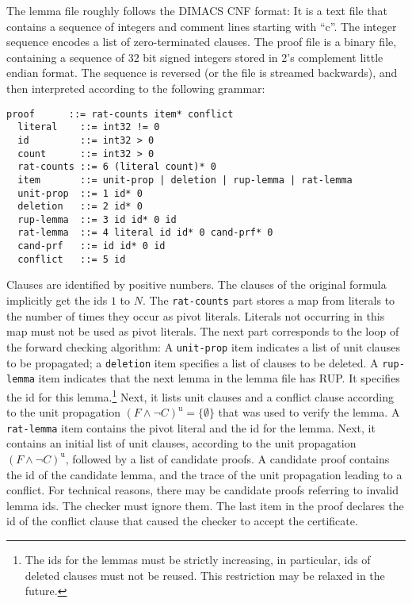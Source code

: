 \documentclass{llncs}
\newcommand{\lsti}{\lstinline[language=pseudo,basicstyle=\normalsize\ttfamily\slshape]}
\begin{document}
The lemma file roughly follows the DIMACS CNF format: It is a text file that contains a sequence of integers and comment lines starting with ``c''. 
The integer sequence encodes a list of zero-terminated clauses.
The proof file is a binary file, containing a sequence of 32 bit signed integers stored in 2's complement little endian format. 
The sequence is reversed (or the file is streamed backwards), and then interpreted according to the following grammar:
\begin{lstlisting}[language={},columns={[c]fullflexible},literate={}]
  proof      ::= rat-counts item* conflict
  literal    ::= int32 != 0
  id         ::= int32 > 0
  count      ::= int32 > 0
  rat-counts ::= 6 (literal count)* 0
  item       ::= unit-prop | deletion | rup-lemma | rat-lemma
  unit-prop  ::= 1 id* 0
  deletion   ::= 2 id* 0
  rup-lemma  ::= 3 id id* 0 id
  rat-lemma  ::= 4 literal id id* 0 cand-prf* 0
  cand-prf   ::= id id* 0 id
  conflict   ::= 5 id
\end{lstlisting}
Clauses are identified by positive numbers. The clauses of the original formula implicitly get the ids $1$ to $N$.
The \lsti{rat-counts} part stores a map from literals to the number of times they occur as pivot literals. Literals not occurring in this map must not be used as pivot literals.
The next part corresponds to the loop of the forward checking algorithm: A \lsti{unit-prop} item indicates a list of unit clauses to be propagated; a \lsti{deletion} item specifies a list
of clauses to be deleted. A \lsti{rup-lemma} item indicates that the next lemma in the lemma file has RUP. 
It specifies the id for this lemma.\footnote{The ids for the lemmas must be strictly increasing, in particular, ids of deleted clauses must not be reused. This restriction may be relaxed in the future.} 
Next, it lists unit clauses and a conflict clause according to the unit propagation $(F \wedge \neg C)^\textrm{u} = \{\emptyset\}$ that was 
used to verify the lemma. A \lsti{rat-lemma} item contains the pivot literal and the id for the lemma. Next, it contains an initial list of unit clauses, according to the unit propagation
$(F \wedge \neg C)^\textrm{u}$, followed by a list of candidate proofs. A candidate proof contains the id of the candidate lemma, and the trace of the unit propagation leading to a conflict.
For technical reasons, there may be candidate proofs referring to invalid lemma ids. The checker must ignore them.
The last item in the proof declares the id of the conflict clause that caused the checker to accept the certificate.
\end{document}
